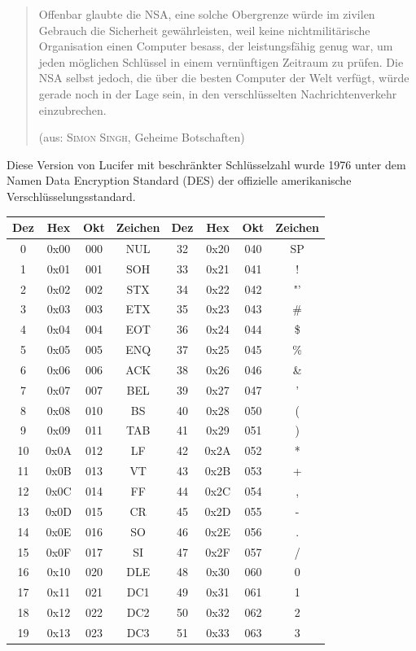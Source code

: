 \documentclass[%
11pt,%
twoside,%
titlepage,%
german,%
headsepline%
]{scrartcl}
\begin{document}
\begin{quote}
\glqq Offenbar glaubte die NSA, eine solche Obergrenze würde im zivilen Gebrauch die Sicherheit gewährleisten, weil keine nichtmilitärische Organisation einen Computer besass, der leistungsfähig genug war, um jeden möglichen Schlüssel in einem vernünftigen Zeitraum zu prüfen. Die NSA selbst jedoch, die über die besten Computer der Welt verfügt, würde gerade noch in der Lage sein, in den verschlüsselten Nachrichtenverkehr einzubrechen.\grqq

(aus: \textsc{Simon Singh}, Geheime Botschaften)
\end{quote}
Diese Version von Lucifer mit beschränkter Schlüsselzahl wurde 1976 unter dem Namen Data Encryption Standard (DES) der offizielle amerikanische Verschlüsselungsstandard.

\begin{longtable}{|c|c|c|c||c|c|c|c|}
\hline
Dez & Hex & Okt & Zeichen & Dez & Hex & Okt & Zeichen\\
\hline
0 & 0x00 & 000 & NUL & 32 & 0x20 & 040 & SP\\
1 & 0x01 & 001 & SOH & 33 & 0x21 & 041 & ! \\
2 & 0x02 & 002 & STX & 34 & 0x22 & 042 & "'\\
3 & 0x03 & 003 & ETX & 35 & 0x23 & 043 & \# \\
4 & 0x04 & 004 & EOT & 36 & 0x24 & 044 & \$ \\
5 & 0x05 & 005 & ENQ & 37 & 0x25 & 045 & \% \\
6 & 0x06 & 006 & ACK & 38 & 0x26 & 046 & \& \\
7 & 0x07 & 007 & BEL & 39 & 0x27 & 047 & ' \\
8 & 0x08 & 010 & BS & 40 & 0x28 & 050 & (  \\
9 & 0x09 & 011 & TAB & 41 & 0x29 & 051 &  ) \\
10 & 0x0A & 012 & LF & 42 & 0x2A & 052 & * \\
11 & 0x0B & 013 & VT & 43 & 0x2B & 053 & + \\
12 & 0x0C & 014 & FF & 44 & 0x2C & 054 & , \\
13 & 0x0D & 015 & CR & 45 & 0x2D & 055 & - \\
14 & 0x0E & 016 & SO & 46 & 0x2E & 056 & . \\
15 & 0x0F & 017 & SI & 47 & 0x2F & 057 & / \\
16 & 0x10 & 020 & DLE & 48 & 0x30 & 060 & 0 \\
17 & 0x11 & 021 & DC1 & 49 & 0x31 & 061 & 1 \\
18 & 0x12 & 022 & DC2 & 50 & 0x32 & 062 & 2 \\
19 & 0x13 & 023 & DC3 & 51 & 0x33 & 063 & 3 \\
\hline
\end{longtable}
\end{document}
